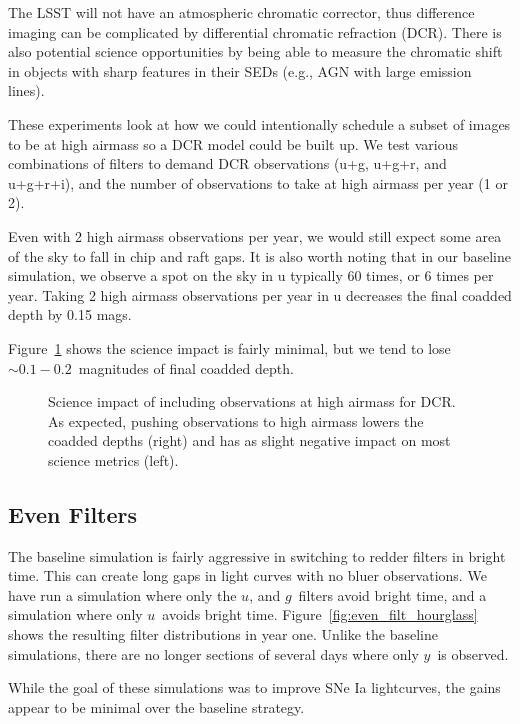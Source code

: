 The LSST will not have an atmospheric chromatic corrector, thus difference imaging can be complicated by differential chromatic refraction (DCR). There is also potential science opportunities by being able to measure the chromatic shift in objects with sharp features in their SEDs (e.g., AGN with large emission lines).

These experiments look at how we could intentionally schedule a subset of images to be at high airmass so a DCR model could be built up. We test various combinations of filters to demand DCR observations (u+g, u+g+r, and u+g+r+i), and the number of observations to take at high airmass per year (1 or 2). 

Even with 2 high airmass observations per year, we would still expect some area of the sky to fall in chip and raft gaps.  It is also worth noting that in our baseline simulation, we observe a spot on the sky in u typically 60 times, or 6 times per year. Taking 2 high airmass observations per year in u decreases the final coadded depth by 0.15 mags.

Figure~\ref{fig:dcr_radar} shows the science impact is fairly minimal, but we tend to lose $\sim0.1-0.2$\ magnitudes of final coadded depth.

\begin{figure}
\caption{Science impact of including observations at high airmass for DCR. As expected, pushing observations to high airmass lowers the coadded depths (right) and has as slight negative impact on most science metrics (left).}\label{fig:dcr_radar}
\end{figure}


\subsection{Even Filters}

The baseline simulation is fairly aggressive in switching to redder filters in bright time. This can create long gaps in light curves with no bluer observations. We have run a simulation where only the $u$, and $g$\ filters avoid bright time, and a simulation where only $u$\ avoids bright time. Figure~\ref{fig:even_filt_hourglass} shows the resulting filter distributions in year one. Unlike the baseline simulations, there are no longer sections of several days where only $y$\ is observed.

While the goal of these simulations was to improve SNe Ia lightcurves, the gains appear to be minimal over the baseline strategy.


